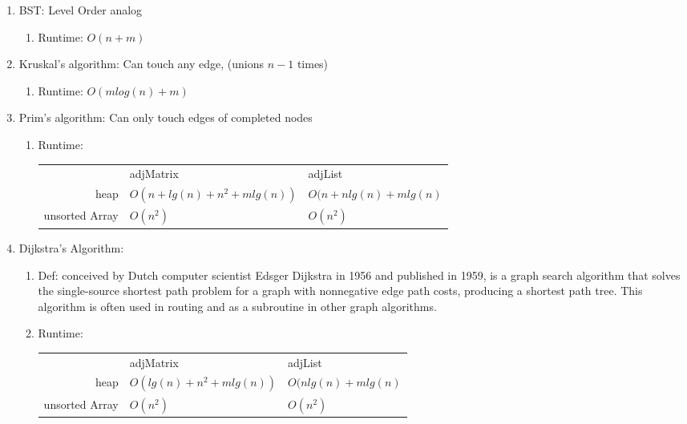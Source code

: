 \documentclass[12pt]{article}
\renewcommand{\=}[1]{\stackrel{#1}{=}} %
\theoremstyle{definition}
\theoremstyle{remark}
\begin{document}
\begin{enumerate}
\begin{enumerate}
\begin{enumerate}
      \item BST: Level Order analog
        \begin{enumerate}
        \item Runtime: $O(n+m)$
        \end{enumerate}

      \item Kruskal's algorithm: Can touch any edge, (unions $n-1$ times)
        \begin{enumerate}
        \item Runtime: $O(mlog(n)+m)$
        \end{enumerate}

      \item Prim's algorithm: Can only touch edges of completed nodes
        \begin{enumerate}
        \item Runtime:
          \begin{tabular*}{1.0\linewidth}{r l l}
                  & adjMatrix & adjList\\
             heap & $O(n+lg(n)+n^2+mlg(n))$ & $O(n+nlg(n)+mlg(n)$\\
             unsorted Array & $O(n^2)$ & $O(n^2)$
          \end{tabular*}

        \end{enumerate}

      \item Dijkstra’s Algorithm:
        \begin{enumerate}
        \item Def: conceived by Dutch computer scientist Edsger Dijkstra in 1956 and published in 1959, is a graph search algorithm that solves the single-source shortest path problem for a graph with nonnegative edge path costs, producing a shortest path tree. This algorithm is often used in routing and as a subroutine in other graph algorithms.
        \item Runtime:
          \begin{tabular*}{1.0\linewidth}{r l l}
                  & adjMatrix & adjList\\
             heap & $O(lg(n)+n^2+mlg(n))$ & $O(nlg(n)+mlg(n)$\\
             unsorted Array & $O(n^2)$ & $O(n^2)$
          \end{tabular*}
        \end{enumerate}


\end{enumerate}
\end{enumerate}
\end{enumerate}
\end{document}
